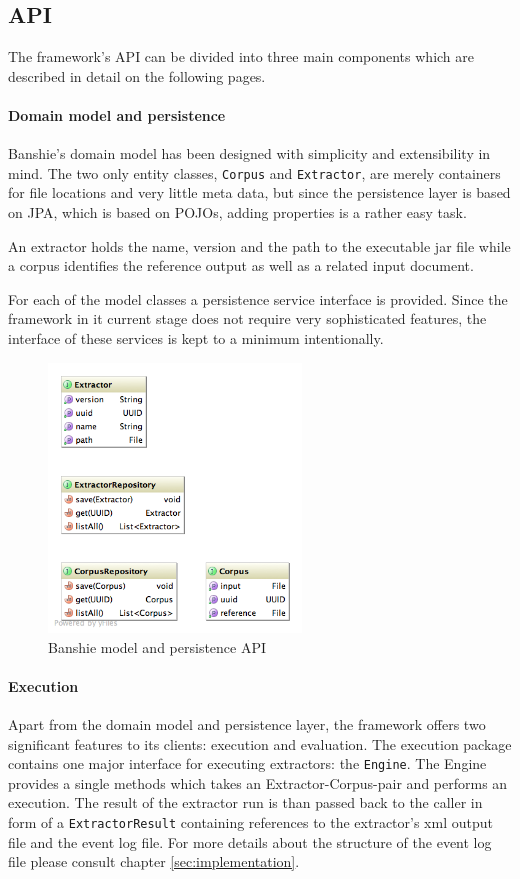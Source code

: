 \newpage
\subsection{API}
The framework's \gls{API} can be divided into three main components which are described in detail on the following pages.

\paragraph{Domain model and persistence}
Banshie's domain model has been designed with simplicity and extensibility in mind. The two only entity classes, \texttt{Corpus} and \texttt{Extractor}, are merely containers for file locations and very little meta data, but since the persistence layer is based on \gls{JPA}, which is based on \gls{POJO}s, adding properties is a rather easy task.

An extractor holds the name, version and the path to the executable jar file while a corpus identifies the reference output as well as a related input document.

For each of the model classes a persistence service interface is provided. Since the framework in it current stage does not require very sophisticated features, the interface of these services is kept to a minimum intentionally.

\begin{figure}[H]
\centering
\includegraphics[width=0.6\textwidth]{api-model.png}
\caption{Banshie model and persistence API}
\end{figure}

\paragraph{Execution}
Apart from the domain model and persistence layer, the framework offers two significant features to its clients: execution and evaluation. The execution package contains one major interface for executing extractors: the \texttt{Engine}. The Engine provides a single methods which takes an Extractor-Corpus-pair and performs an execution. The result of the extractor run is than passed back to the caller in form of a \texttt{ExtractorResult} containing references to the extractor's xml output file and the event log file. For more details about the structure of the event log file please consult chapter \ref{sec:implementation}.

